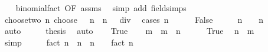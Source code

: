 \begin{isabellebody}
%
\isadelimproof
\ \ %
\endisadelimproof
%
\isatagproof
{}\isamarkupfalse%
\ binomial{\isacharunderscore}{\kern0pt}fact\ {\isacharbrackleft}{\kern0pt}OF\ assms{\isacharbrackright}{\kern0pt}\ \isamarkupfalse%
\ {\isacharparenleft}{\kern0pt}simp\ add{\isacharcolon}{\kern0pt}\ field{\isacharunderscore}{\kern0pt}simps{\isacharparenright}{\kern0pt}%
\endisatagproof
{\isafoldproof}%
%
\isadelimproof
\isanewline
%
\endisadelimproof
\isanewline
{}\isamarkupfalse%
\ choose{\isacharunderscore}{\kern0pt}two{\isacharcolon}{\kern0pt}\ {\isachardoublequoteopen}n\ choose\ {}\ {\isacharequal}{\kern0pt}\ n\ {\isacharasterisk}{\kern0pt}\ {\isacharparenleft}{\kern0pt}n\ {\isacharminus}{\kern0pt}\ {}{\isacharparenright}{\kern0pt}\ div\ {}{\isachardoublequoteclose}\isanewline
%
\isadelimproof
%
\endisadelimproof
%
\isatagproof
{}\isamarkupfalse%
\ {\isacharparenleft}{\kern0pt}cases\ {\isachardoublequoteopen}n\ {\isasymge}\ {}{\isachardoublequoteclose}{\isacharparenright}{\kern0pt}\isanewline
\ \ \isamarkupfalse%
\ False\isanewline
\ \ \isamarkupfalse%
\ \isamarkupfalse%
\ {\isachardoublequoteopen}n\ {\isacharequal}{\kern0pt}\ {}\ {\isasymor}\ n\ {\isacharequal}{\kern0pt}\ {}{\isachardoublequoteclose}\isanewline
\ \ \ \ \isamarkupfalse%
\ auto\isanewline
\ \ \isamarkupfalse%
\ \isamarkupfalse%
\ {\isacharquery}{\kern0pt}thesis\ \isamarkupfalse%
\ auto\isanewline
{}\isamarkupfalse%
\isanewline
\ \ \isamarkupfalse%
\ True\isanewline
\ \ \isamarkupfalse%
\ m\ \ {\isachardoublequoteopen}m\ {\isacharequal}{\kern0pt}\ n\ {\isacharminus}{\kern0pt}\ {}{\isachardoublequoteclose}\isanewline
\ \ \isamarkupfalse%
\ True\ \isamarkupfalse%
\ {\isachardoublequoteopen}n\ {\isacharequal}{\kern0pt}\ m\ {\isacharplus}{\kern0pt}\ {}{\isachardoublequoteclose}\isanewline
\ \ \ \ \isamarkupfalse%
\ simp\isanewline
\ \ \isamarkupfalse%
\ \isamarkupfalse%
\ {\isachardoublequoteopen}fact\ n\ {\isacharequal}{\kern0pt}\ n\ {\isacharasterisk}{\kern0pt}\ {\isacharparenleft}{\kern0pt}n\ {\isacharminus}{\kern0pt}\ {}{\isacharparenright}{\kern0pt}\ {\isacharasterisk}{\kern0pt}\ fact\ {\isacharparenleft}{\kern0pt}n\ {\isacharminus}{\kern0pt}\ {}{\isacharparenright}{\kern0pt}{\isachardoublequoteclose}\isanewline

\end{isabellebody}
